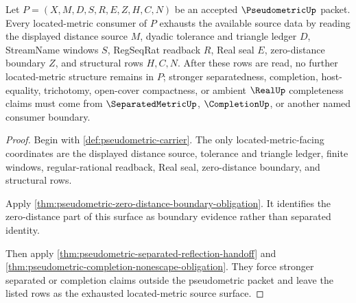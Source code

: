 \begin{theorem}
\label{thm:pseudometric-located-metric-source-exhaustion}
Let $P=(X,M,D,S,R,E,Z,H,C,N)$ be an accepted $\PseudometricUp$ packet. Every located-metric consumer of $P$ exhausts the available source data by reading the displayed distance source $M$, dyadic tolerance and triangle ledger $D$, StreamName windows $S$, RegSeqRat readback $R$, Real seal $E$, zero-distance boundary $Z$, and structural rows $H,C,N$. After these rows are read, no further located-metric structure remains in $P$; stronger separatedness, completion, host-equality, trichotomy, open-cover compactness, or ambient $\RealUp$ completeness claims must come from $\SeparatedMetricUp$, $\CompletionUp$, or another named consumer boundary.
\end{theorem}
\begin{proof}
Begin with \autoref{def:pseudometric-carrier}. The only located-metric-facing coordinates are the displayed distance source, tolerance and triangle ledger, finite windows, regular-rational readback, Real seal, zero-distance boundary, and structural rows.

Apply \autoref{thm:pseudometric-zero-distance-boundary-obligation}. It identifies the zero-distance part of this surface as boundary evidence rather than separated identity.

Then apply \autoref{thm:pseudometric-separated-reflection-handoff} and \autoref{thm:pseudometric-completion-nonescape-obligation}. They force stronger separated or completion claims outside the pseudometric packet and leave the listed rows as the exhausted located-metric source surface.
\end{proof}

